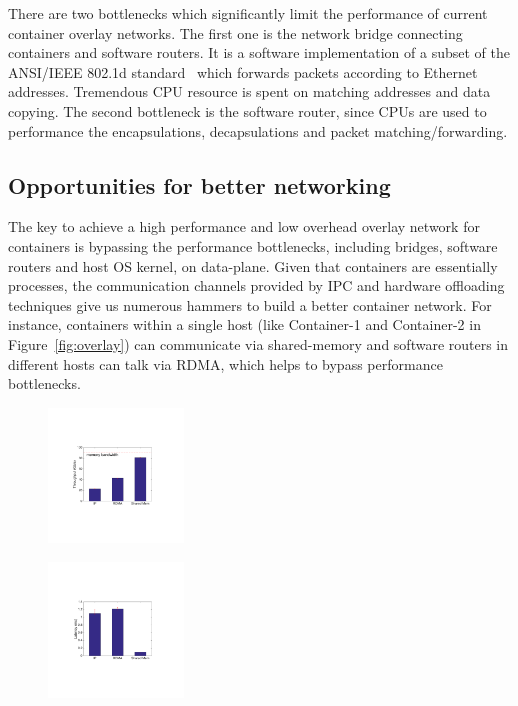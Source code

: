 There are two bottlenecks which significantly limit the performance
of current container overlay networks. The first one is the network bridge
connecting containers and software routers. It is a software implementation
of a subset of the ANSI/IEEE 802.1d standard~\cite{?} which forwards packets
according to Ethernet addresses. Tremendous CPU resource is spent on matching
addresses and data copying. The second bottleneck is the software router, since
CPUs are used to performance the encapsulations, decapsulations and packet matching/forwarding.


\subsection{Opportunities for better networking}

The key to achieve a high performance and low overhead overlay network
for containers is bypassing the performance bottlenecks, including
bridges, software routers and host OS kernel, on data-plane. Given that
containers are essentially processes, the communication channels provided
by IPC and hardware offloading techniques give us numerous hammers to 
build a better container network. For instance, 
containers within a single host (like Container-1 and 
Container-2 in Figure~\ref{fig:overlay}) can communicate via 
shared-memory and software routers in different hosts can talk via RDMA, 
which helps to bypass performance bottlenecks.

     \begin{figure}[ht]
     \centering 
     \includegraphics[width=0.32\textwidth]{figures/motivation/eval_baremetal_thr.pdf}      
     \label{fig:eval_baremetal_thr}
     \caption{} 
     \end{figure}

     \begin{figure}[ht]
     \centering 
     \includegraphics[width=0.32\textwidth]{figures/motivation/eval_baremetal_latency.pdf}      
     \label{fig:eval_baremetal_latency}
     \caption{} 
     \end{figure}

